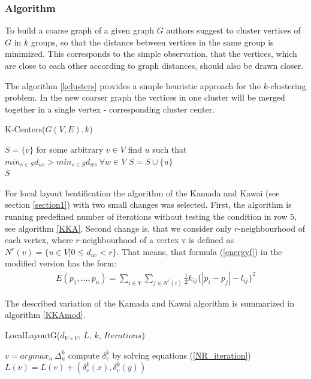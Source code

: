 \documentclass[12pt,a4paper]{article}
\begin{document}
\subsubsection*{Algorithm}
To build a coarse graph of a given graph $G$ authors suggest to cluster vertices of $G$ in $k$ groups, so that the distance between vertices in the same group is minimized. This corresponds to the simple observation, that the vertices, which are close to each other according to graph distances, should also be drawn closer.

The algorithm \ref{kclusters} provides a simple heuristic approach for the $k$-clustering problem. In the new coarser graph the vertices in one cluster will be merged together in a single vertex - corresponding cluster center.

\begin{algorithm}
\caption{K-Centers($G(V,E),k$) \cite{DavidHarel2002}}
\label{kclusters}
\begin{algorithmic}[1]
\State $S=\{v\}$ for some arbitrary $v\in V$
	\State find $u$ such that $min_{s\in S}d_{us}>min_{s\in S} d_{ws}\ \forall w\in V$ 
	\State $S = S\cup\{u\}$
\EndFor \\
\Return $S$
\end{algorithmic}
\end{algorithm}

For local layout beatification the algorithm of the Kamada and Kawai (see section \ref{section1}) with two small changes was selected. First, the algorithm is running predefined number of iterations without testing the condition in row $5$, see algorithm \ref{KKA}. Second change is, that we consider only $r$-neighbourhood of each vertex, where $r$-neighbourhood of a vertex v is defined as $N^r(v)=\{u\in V| 0\le d_{uv}<r\}$. That means, that formula (\ref{energyf}) in the modified version has the form:
\begin{align}
\label{energyf_HK}
E(p_1 , \dots, p_n) = \sum_{i\in V} \sum_{j\in N^r(i)} \frac{1}{2} k_{ij} \lbrace | p_i - p_j | - l_{ij} \rbrace^2
\end{align}

The described variation of the Kamada and Kawai algorithm is summarized in algorithm \ref{KKAmod}.

\begin{algorithm}
\caption{LocalLayoutG($d_{V\times V}$, $L$, $k$, $Iterations$) \cite{DavidHarel2002}}
\label{KKAmod}
\begin{algorithmic}[1]
	\State $v = argmax_{u}\ \Delta^k_u$
	\State compute $\delta^k_v$ by solving equations (\ref{NR_iteration})
	\State $L(v)=L(v) + (\delta^k_v(x), \delta^k_v(y))$
\EndFor
\end{algorithmic}
\end{algorithm}
\end{document}
